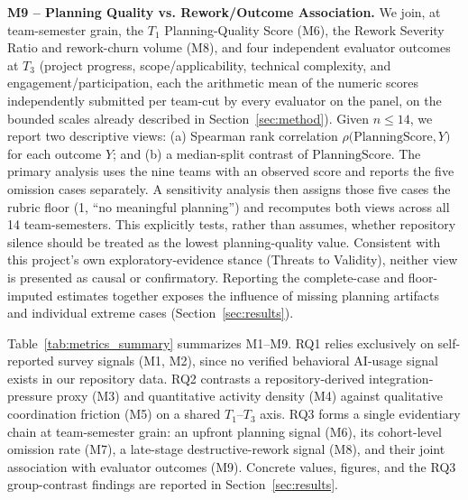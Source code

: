 \documentclass[conference]{IEEEtran}
\begin{document}
\textbf{M9 -- Planning Quality vs. Rework/Outcome Association.} We join, at
team-semester grain, the $T_1$ Planning-Quality Score (M6), the Rework
Severity Ratio and rework-churn volume (M8), and four independent evaluator
outcomes at $T_3$ (project progress, scope/applicability, technical
complexity, and engagement/participation, each the arithmetic mean of the
numeric scores independently submitted per team-cut by every evaluator on
the panel, on the bounded scales already described in
Section~\ref{sec:method}). Given $n \leq 14$, we report two descriptive
views: (a) Spearman rank correlation $\rho\big(\mathrm{PlanningScore}, Y\big)$
for each outcome $Y$; and (b) a median-split contrast of
$\mathrm{PlanningScore}$. The primary analysis uses the nine teams with an
observed score and reports the five omission cases separately. A sensitivity
analysis then assigns those five cases the rubric floor (1, ``no meaningful
planning'') and recomputes both views across all 14 team-semesters. This
explicitly tests, rather than assumes, whether repository silence should be
treated as the lowest planning-quality value.
Consistent with this project's own exploratory-evidence stance (Threats to
Validity), neither view is presented as causal or confirmatory. Reporting the
complete-case and floor-imputed estimates together exposes the influence of
missing planning artifacts and individual extreme cases
(Section~\ref{sec:results}).

Table~\ref{tab:metrics_summary} summarizes M1--M9. RQ1 relies exclusively on
self-reported survey signals (M1, M2), since no
verified behavioral AI-usage signal exists in our repository data. RQ2
contrasts a repository-derived integration-pressure proxy (M3) and
quantitative activity density (M4) against qualitative coordination friction
(M5) on a shared $T_1\text{--}T_3$ axis. RQ3 forms a single evidentiary chain
at team-semester grain: an upfront planning signal (M6), its cohort-level
omission rate (M7), a late-stage destructive-rework signal (M8), and their
joint association with evaluator outcomes (M9). Concrete values, figures, and
the RQ3 group-contrast findings are reported in Section~\ref{sec:results}.
\end{document}
